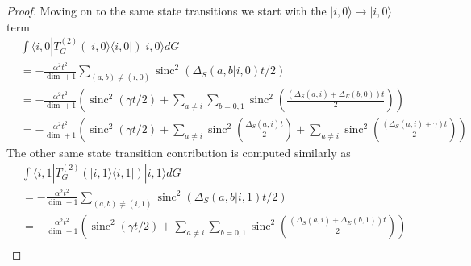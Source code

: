 \documentclass{article}
\newcommand{\ket}[1]{|#1\rangle}
\newcommand{\bra}[1]{\langle #1|}
\newcommand{\ketbra}[2]{| #1\rangle\! \langle #2|}
\newcommand{\parens}[1]{\left( #1 \right)}
\DeclareMathOperator{\sinc}{sinc}
\begin{document}
\begin{proof}
    Moving on to the same state transitions we start with the $\ket{i, 0} \to \ket{i, 0}$ term
    \begin{align}
        &\int \bra{i,0} T^{(2)}_G (\ketbra{i, 0}{i, 0}) \ket{i,0} dG \nonumber \\
        &= -\frac{\alpha^2 t^2}{\dim + 1} \sum_{(a,b) \neq (i, 0)} \sinc^2 \parens{\Delta_S(a, b | i, 0) t / 2} \\ 
        &= - \frac{\alpha^2 t^2}{\dim  + 1} \parens{\sinc^2 (\gamma t / 2) + \sum_{a \neq i} \sum_{b = 0, 1} \sinc^2\parens{\frac{(\Delta_S(a, i) + \Delta_E(b, 0))t}{2}} } \\
        &=- \frac{\alpha^2 t^2}{\dim  + 1} \parens{\sinc^2 (\gamma t / 2) + \sum_{a \neq i} \sinc^2 \left( \frac{\Delta_S(a, i) t}{2} \right) + \sum_{a \neq i} \sinc^2\parens{\frac{(\Delta_S(a, i) +\gamma)t}{2}} }
    \end{align}
    The other same state transition contribution is computed similarly as
        \begin{align}
        &\int \bra{i,1} T^{(2)}_G (\ketbra{i, 1}{i, 1}) \ket{i,1} dG \nonumber \\
        &= -\frac{\alpha^2 t^2}{\dim + 1} \sum_{(a,b) \neq (i, 1)} \sinc^2 \parens{\Delta_S(a, b | i, 1) t / 2} \\ 
        &= - \frac{\alpha^2 t^2}{\dim  + 1} \parens{\sinc^2 (\gamma t / 2) + \sum_{a \neq i} \sum_{b = 0, 1} \sinc^2\parens{\frac{(\Delta_S(a, i) + \Delta_E(b, 1))t}{2}} } \\

\end{align}
\end{proof}
\end{document}
